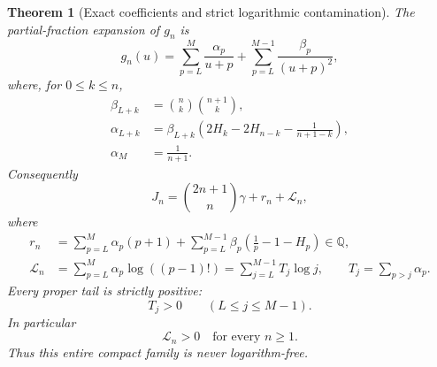 \documentclass[11pt]{article}
\newtheorem{theorem}{Theorem}[section]
\theoremstyle{definition}
\theoremstyle{remark}
\newcommand{\Q}{\mathbb Q}
\begin{document}
\begin{theorem}[Exact coefficients and strict logarithmic contamination]
\label{thm:Jn-exact-strict-contamination}
The partial-fraction expansion of \(g_n\) is
\[
 g_n(u)=\sum_{p=L}^{M}\frac{\alpha_p}{u+p}
       +\sum_{p=L}^{M-1}\frac{\beta_p}{(u+p)^2},
\]
where, for \(0\le k\le n\),
\begin{align}
 \beta_{L+k}
 &=\binom nk\binom{n+1}{k},
 \label{eq:Jn-beta}\\
 \alpha_{L+k}
 &=\beta_{L+k}\left(
 2H_k-2H_{n-k}-\frac1{n+1-k}\right),
 \label{eq:Jn-alpha}\\
 \alpha_M&=\frac1{n+1}.
 \label{eq:Jn-alpha-last}
\end{align}
Consequently
\begin{equation}\label{eq:Jn-exact-linear-form}
 J_n=\binom{2n+1}{n}\gamma+r_n+\mathcal L_n,
\end{equation}
where
\begin{align}
 r_n
 &=\sum_{p=L}^{M}\alpha_p(p+1)
   +\sum_{p=L}^{M-1}\beta_p
      \left(\frac1p-1-H_p\right)\in\Q,
 \label{eq:Jn-rational-part}\\
 \mathcal L_n
 &=\sum_{p=L}^{M}\alpha_p\log((p-1)!)
   =\sum_{j=L}^{M-1}T_j\log j,
 \qquad
 T_j=\sum_{p>j}\alpha_p.
 \label{eq:Jn-log-part}
\end{align}
Every proper tail is strictly positive:
\begin{equation}\label{eq:Jn-positive-tails}
 T_j>0\qquad(L\le j\le M-1).
\end{equation}
In particular
\begin{equation}\label{eq:Jn-log-positive}
 \boxed{\mathcal L_n>0\quad\text{for every }n\ge1.}
\end{equation}
Thus this entire compact family is never logarithm-free.
\end{theorem}
\end{document}
